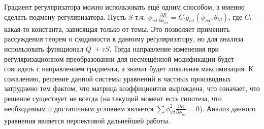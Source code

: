 \documentclass[12pt]{article}
\begin{document}
Градиент регуляризатора можно использовать ещё одним способом, а именно сделать подмену регуляризатора. Пусть $S$ т.ч. $\phi_{wt}\frac{\partial{R}}{\partial{\phi_{wt}}} = C_t g_{wt}(\phi_{wt}, \theta_{td})$, где $C_t$ -- какая-то константа, зависящая только от темы. Это позволяет применить рассуждения теорем о сходимости к данному регуляризатору, но для анализа использовать функционал $Q^{\prime} + \tau S$. Тогда направление изменения при регуляризационном преобразовании для несмещённой модификации будет совпадать с направлением градиента, а значит будет локальная максимизация. К сожалению, решение данной системы уравнений в частных производных затруднено тем фактом, что матрица коэффициентов вырождена, что означает, что решение существует не всегда (на текущий момент есть гипотеза, что необходимым и достаточным условием является $\sum \phi_{wt}^2 \frac{\partial{R}}{\partial{\phi_{wt}}} = 0$). Анализ данного уравнения является перпективой дальнейшей работы.
\end{document}

